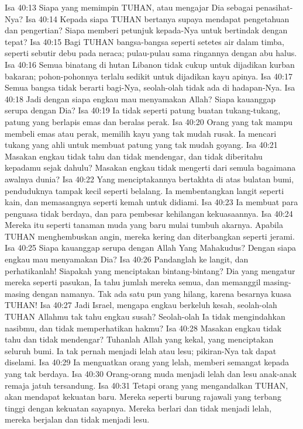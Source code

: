Isa 40:13  Siapa yang memimpin TUHAN, atau mengajar Dia sebagai penasihat-Nya?
Isa 40:14  Kepada siapa TUHAN bertanya supaya mendapat pengetahuan dan pengertian? Siapa memberi petunjuk kepada-Nya untuk bertindak dengan tepat?
Isa 40:15  Bagi TUHAN bangsa-bangsa seperti setetes air dalam timba, seperti sebutir debu pada neraca; pulau-pulau sama ringannya dengan abu halus.
Isa 40:16  Semua binatang di hutan Libanon tidak cukup untuk dijadikan kurban bakaran; pohon-pohonnya terlalu sedikit untuk dijadikan kayu apinya.
Isa 40:17  Semua bangsa tidak berarti bagi-Nya, seolah-olah tidak ada di hadapan-Nya.
Isa 40:18  Jadi dengan siapa engkau mau menyamakan Allah? Siapa kauanggap serupa dengan Dia?
Isa 40:19  Ia tidak seperti patung buatan tukang-tukang, patung yang berlapis emas dan beralas perak.
Isa 40:20  Orang yang tak mampu membeli emas atau perak, memilih kayu yang tak mudah rusak. Ia mencari tukang yang ahli untuk membuat patung yang tak mudah goyang.
Isa 40:21  Masakan engkau tidak tahu dan tidak mendengar, dan tidak diberitahu kepadamu sejak dahulu? Masakan engkau tidak mengerti dari semula bagaimana awalnya dunia?
Isa 40:22  Yang menciptakannya bertakhta di atas bulatan bumi, penduduknya tampak kecil seperti belalang. Ia membentangkan langit seperti kain, dan memasangnya seperti kemah untuk didiami.
Isa 40:23  Ia membuat para penguasa tidak berdaya, dan para pembesar kehilangan kekuasaannya.
Isa 40:24  Mereka itu seperti tanaman muda yang baru mulai tumbuh akarnya. Apabila TUHAN menghembuskan angin, mereka kering dan diterbangkan seperti jerami.
Isa 40:25  Siapa kauanggap serupa dengan Allah Yang Mahakudus? Dengan siapa engkau mau menyamakan Dia?
Isa 40:26  Pandanglah ke langit, dan perhatikanlah! Siapakah yang menciptakan bintang-bintang? Dia yang mengatur mereka seperti pasukan, Ia tahu jumlah mereka semua, dan memanggil masing-masing dengan namanya. Tak ada satu pun yang hilang, karena besarnya kuasa TUHAN!
Isa 40:27  Jadi Israel, mengapa engkau berkeluh kesah, seolah-olah TUHAN Allahmu tak tahu engkau susah? Seolah-olah Ia tidak mengindahkan nasibmu, dan tidak memperhatikan hakmu?
Isa 40:28  Masakan engkau tidak tahu dan tidak mendengar? Tuhanlah Allah yang kekal, yang menciptakan seluruh bumi. Ia tak pernah menjadi lelah atau lesu; pikiran-Nya tak dapat diselami.
Isa 40:29  Ia menguatkan orang yang lelah, memberi semangat kepada yang tak berdaya.
Isa 40:30  Orang-orang muda menjadi lelah dan lesu anak-anak remaja jatuh tersandung.
Isa 40:31  Tetapi orang yang mengandalkan TUHAN, akan mendapat kekuatan baru. Mereka seperti burung rajawali yang terbang tinggi dengan kekuatan sayapnya. Mereka berlari dan tidak menjadi lelah, mereka berjalan dan tidak menjadi lesu.
